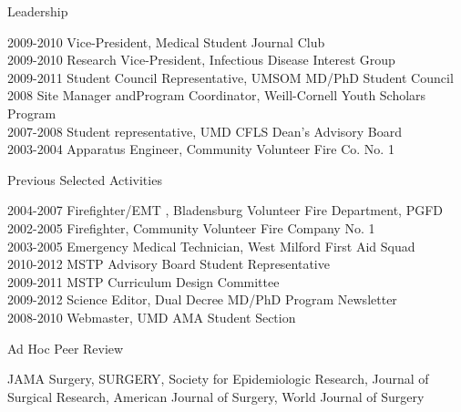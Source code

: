 \documentclass{resume} %
\begin{document}
   \begin{rSection}{Leadership}
     

   2009-2010 \enspace Vice-President, Medical Student Journal Club\\
   2009-2010 \enspace Research Vice-President, Infectious Disease Interest Group\\
   2009-2011 \enspace Student Council Representative, UMSOM MD/PhD Student Council\\
   2008 \hspace{27.5pt} Site Manager andProgram Coordinator, Weill-Cornell Youth Scholars Program\\
   2007-2008 \enspace Student representative, UMD CFLS Dean’s Advisory Board\\
   2003-2004 \enspace Apparatus Engineer, Community Volunteer Fire Co. No. 1
   
   \end{rSection}
   

\begin{rSection}{Previous Selected Activities}

   2004-2007 \enspace Firefighter/EMT , Bladensburg Volunteer Fire Department, PGFD\\
   2002-2005 \enspace Firefighter, Community Volunteer Fire Company No. 1\\
   2003-2005 \enspace Emergency Medical Technician, West Milford First Aid Squad	\\
   2010-2012 \enspace MSTP Advisory Board Student Representative \\
   2009-2011 \enspace MSTP Curriculum Design Committee	\\
   2009-2012 \enspace Science Editor, Dual Decree MD/PhD Program Newsletter         \\
   2008-2010 \enspace Webmaster, UMD AMA Student Section

   
   \end{rSection}
   
   
   
   \begin{rSection}{Ad Hoc Peer Review}
 
   JAMA Surgery, SURGERY, Society for Epidemiologic Research, Journal of Surgical Research, American Journal of Surgery, World Journal of Surgery
  
   
   \end{rSection}
   
\end{document}
